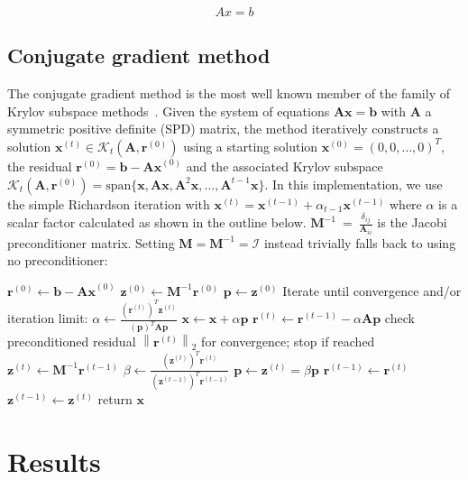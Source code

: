 \documentclass[11pt,a4paper]{article}
\renewcommand{\vec}[1]{\mathbf{#1}}
\newcommand{\norm}[1]{\left\lVert#1\right\rVert}
\begin{document}
\begin{equation}
Ax = b
\label{eqn:3}
\end{equation}


\subsection{Conjugate gradient method}
The conjugate gradient method is the most well known member of the family of Krylov subspace methods~\cite{elman}.
Given the system of equations $\vec{Ax}=\vec{b}$ with $\vec{A}$ a symmetric positive definite (SPD) matrix, the method iteratively constructs a solution $\vec{x}^{(t)} \in \mathcal{K}_t(\vec{A}, \vec{r}^{(0)})$ using a starting solution $\vec{x}^{(0)} = (0,0,\ldots, 0)^T$,
the residual $\vec{r}^{(0)}=\vec{b} - \vec{Ax}^{(0)}$ and the associated Krylov subspace $\mathcal{K}_t(\vec{A}, \vec{r}^{(0)})=\text{span}\{\vec{x}, \vec{Ax}, \vec{A}^2\vec{x}, \ldots, \vec{A}^{t-1}\vec{x}\}$.
In this implementation, we use the simple Richardson iteration with $\vec{x}^{(t)}=\vec{x}^{(t-1)} + \alpha_{t-1}\vec{x}^{(t-1)}$ where $\alpha$ is a scalar factor
calculated as shown in the outline below. $\vec{M}^{-1}\ =\ \frac{\delta_{ij}}{\vec{A}_{ii}}$ is the Jacobi preconditioner matrix. Setting $\vec{M} = \vec{M}^{-1} = \vec{\mathcal{I}}$ instead trivially falls back to 
using no preconditioner:
\begin{outline}
\1 $\vec{r}^{(0)} \leftarrow \vec{b} - \vec{Ax}^{(0)}$
\1 $\vec{z}^{(0)} \leftarrow \vec{M}^{-1}\vec{r}^{(0)}$
\1 $\vec{p} \leftarrow \vec{z}^{(0)}$ 
\1 Iterate until convergence and/or iteration limit:
    \2 $\alpha \leftarrow \frac{(\vec{r}^{(t)})^T \vec{z}^{(t)}}{(\vec{p})^T \vec{Ap}}$
    \2 $\vec{x} \leftarrow \vec{x} + \alpha\vec{p}$
    \2 $\vec{r}^{(t)} \leftarrow \vec{r}^{(t-1)} - \alpha\vec{Ap}$
    \2 check preconditioned residual $\norm{\vec{r}^{(t)}}_2$ for convergence; stop if reached
    \2 $\vec{z}^{(t)} \leftarrow \vec{M}^{-1} \vec{r}^{(t-1)}$
    \2 $\beta \leftarrow \frac{(\vec{z}^{(t)})^T \vec{r}^{(t)}}{(\vec{z}^{(t-1)})^T \vec{r}^{(t-1)}}$
    \2 $\vec{p} \leftarrow \vec{z}^{(t)} = \beta \vec{p} $
    \2 $\vec{r}^{(t-1)} \leftarrow \vec{r}^{(t)}$
    \2 $\vec{z}^{(t-1)} \leftarrow \vec{z}^{(t)}$ 
\1 return $\vec{x}$
\end{outline}


\section{Results}
\end{document}
